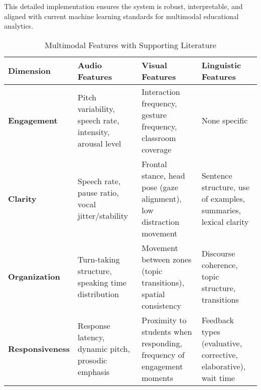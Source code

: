 This detailed implementation ensures the system is robust, interpretable, and aligned with current machine learning standards for multimodal educational analytics.

\sloppy %
\begin{table*}[htbp]
\centering
\renewcommand{\arraystretch}{1.5} %
\setlength{\tabcolsep}{8pt} %
\caption{Multimodal Features with Supporting Literature}
\begin{tabularx}{\textwidth}{|>{\raggedright\arraybackslash}X|>{\raggedright\arraybackslash}X|>{\raggedright\arraybackslash}X|>{\raggedright\arraybackslash}X|}
\hline
	\textbf{\normalsize Dimension} & \textbf{\normalsize Audio Features} & \textbf{\normalsize Visual Features} & \textbf{\normalsize Linguistic Features} \\
\hline

	\textbf{Engagement} & 
Pitch variability, speech rate, intensity, arousal level \cite{hou2024encouragement, dmello2012multimodal} & 
Interaction frequency, gesture frequency, classroom coverage \cite{mcneill1992hand, ochoa2016multimodal} & 
None specific \cite{hou2024encouragement, dmello2012multimodal} \\
\hline

	\textbf{Clarity} & 
Speech rate, pause ratio, vocal jitter/stability \cite{falcon2024discourse, rowe1986wait} & 
Frontal stance, head pose (gaze alignment), low distraction movement \cite{mcneill1992hand, ochoa2016multimodal} & 
Sentence structure, use of examples, summaries, lexical clarity \cite{falcon2024discourse, rowe1986wait} \\
\hline

	\textbf{Organization} & 
Turn-taking structure, speaking time distribution \cite{ochoa2016multimodal, dmello2012multimodal} & 
Movement between zones (topic transitions), spatial consistency \cite{mcneill1992hand, ochoa2016multimodal} & 
Discourse coherence, topic structure, transitions \cite{ochoa2016multimodal, dmello2012multimodal} \\
\hline

	\textbf{Responsiveness} & 
Response latency, dynamic pitch, prosodic emphasis \cite{rowe1986wait, dmello2012multimodal} & 
Proximity to students when responding, frequency of engagement moments \cite{mcneill1992hand, ochoa2016multimodal} & 
Feedback types (evaluative, corrective, elaborative), wait time \cite{rowe1986wait} \\
\hline


\end{tabularx}
\end{table*}

